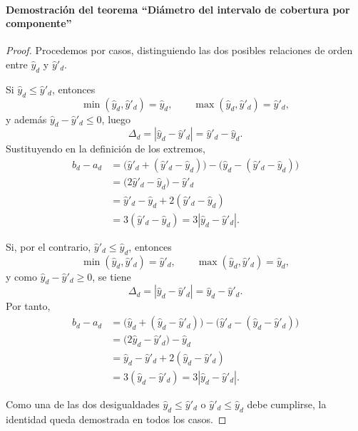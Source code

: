 \documentclass[12pt]{report} %
\begin{document}
\paragraph*{Demostración del teorema ``Diámetro del intervalo de cobertura por componente''}
\begin{proof}
    Procedemos por casos, distinguiendo las dos posibles relaciones de orden entre $\hat{y}_d$ y $\hat{y}'_d$.

    Si $\hat{y}_d \le \hat{y}'_d$, entonces
    $$\min(\hat{y}_d, \hat{y}'_d) = \hat{y}_d,
        \qquad
        \max(\hat{y}_d, \hat{y}'_d) = \hat{y}'_d,$$
    y además $\hat{y}_d - \hat{y}'_d \le 0$, luego
    $$\Delta_d = |\hat{y}_d - \hat{y}'_d| = \hat{y}'_d - \hat{y}_d.$$
    Sustituyendo en la definición de los extremos,
    \begin{align*}
        b_d - a_d
         & = \bigl(\hat{y}'_d + (\hat{y}'_d - \hat{y}_d)\bigr) - \bigl(\hat{y}_d - (\hat{y}'_d - \hat{y}_d)\bigr) \\
         & = \bigl(2\hat{y}'_d - \hat{y}_d\bigr) - \hat{y}'_d                                                     \\
         & = \hat{y}'_d - \hat{y}_d + 2(\hat{y}'_d - \hat{y}_d)                                                   \\
         & = 3(\hat{y}'_d - \hat{y}_d) = 3|\hat{y}_d - \hat{y}'_d|.
    \end{align*}

    Si, por el contrario, $\hat{y}'_d \le \hat{y}_d$, entonces
    $$\min(\hat{y}_d, \hat{y}'_d) = \hat{y}'_d,
        \qquad
        \max(\hat{y}_d, \hat{y}'_d) = \hat{y}_d,$$
    y como $\hat{y}_d - \hat{y}'_d \ge 0$, se tiene
    $$\Delta_d = |\hat{y}_d - \hat{y}'_d| = \hat{y}_d - \hat{y}'_d.$$
    Por tanto,
    \begin{align*}
        b_d - a_d
         & = \bigl(\hat{y}_d + (\hat{y}_d - \hat{y}'_d)\bigr) - \bigl(\hat{y}'_d - (\hat{y}_d - \hat{y}'_d)\bigr) \\
         & = \bigl(2\hat{y}_d - \hat{y}'_d\bigr) - \hat{y}_d                                                      \\
         & = \hat{y}_d - \hat{y}'_d + 2(\hat{y}_d - \hat{y}'_d)                                                   \\
         & = 3(\hat{y}_d - \hat{y}'_d) = 3|\hat{y}_d - \hat{y}'_d|.
    \end{align*}

    Como una de las dos desigualdades $\hat{y}_d \le \hat{y}'_d$ o $\hat{y}'_d \le \hat{y}_d$ debe cumplirse, la identidad queda demostrada en todos los casos.
\end{proof}
\end{document}
